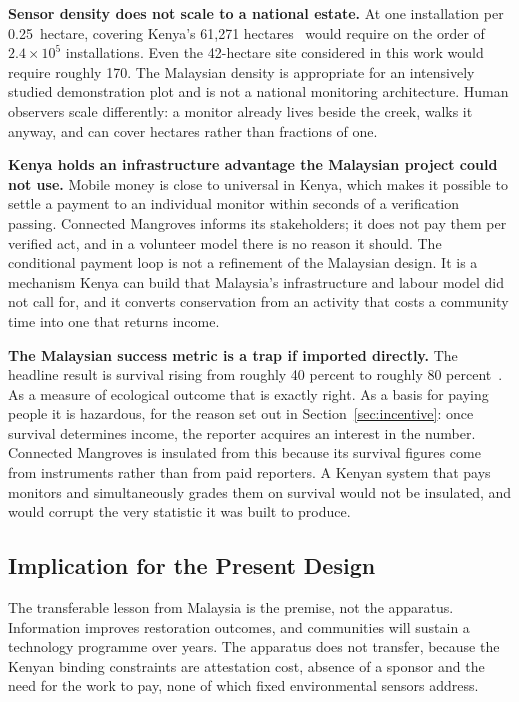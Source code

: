 \documentclass[10pt,twocolumn,a4paper]{article}
\begin{document}
\textbf{Sensor density does not scale to a national estate.} At one installation
per 0.25~hectare, covering Kenya's 61{,}271 hectares~\cite{kairo2021} would
require on the order of $2.4 \times 10^{5}$ installations. Even the 42-hectare
site considered in this work would require roughly 170. The Malaysian density is
appropriate for an intensively studied demonstration plot and is not a national
monitoring architecture. Human observers scale differently: a monitor already
lives beside the creek, walks it anyway, and can cover hectares rather than
fractions of one.

\textbf{Kenya holds an infrastructure advantage the Malaysian project could not
use.} Mobile money is close to universal in Kenya, which makes it possible to
settle a payment to an individual monitor within seconds of a verification
passing. Connected Mangroves informs its stakeholders; it does not pay them per
verified act, and in a volunteer model there is no reason it should. The
conditional payment loop is not a refinement of the Malaysian design. It is a
mechanism Kenya can build that Malaysia's infrastructure and labour model did
not call for, and it converts conservation from an activity that costs a
community time into one that returns income.

\textbf{The Malaysian success metric is a trap if imported directly.} The
headline result is survival rising from roughly 40 percent to roughly 80
percent~\cite{unfccc2015,ericsson2019}. As a measure of ecological outcome that
is exactly right. As a basis for paying people it is hazardous, for the reason
set out in Section~\ref{sec:incentive}: once survival determines income, the
reporter acquires an interest in the number. Connected Mangroves is insulated
from this because its survival figures come from instruments rather than from
paid reporters. A Kenyan system that pays monitors and simultaneously grades
them on survival would not be insulated, and would corrupt the very statistic it
was built to produce.

\subsection{Implication for the Present Design}

The transferable lesson from Malaysia is the premise, not the apparatus.
Information improves restoration outcomes, and communities will sustain a
technology programme over years. The apparatus does not transfer, because the
Kenyan binding constraints are attestation cost, absence of a sponsor and the
need for the work to pay, none of which fixed environmental sensors address.
\end{document}
